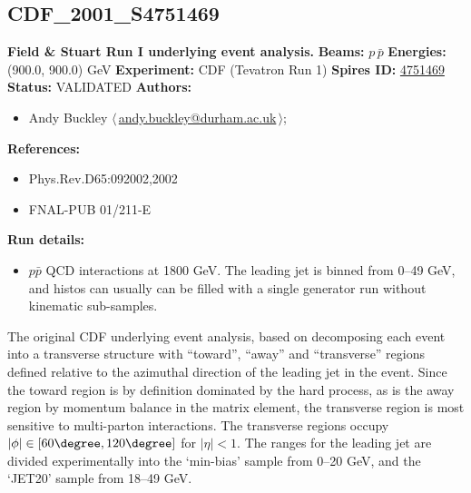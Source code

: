 \subsection[CDF\_2001\_S4751469]{CDF\_2001\_S4751469\,\cite{Affolder:2001xt}}
\textbf{Field \& Stuart Run I underlying event analysis.}\newline
\textbf{Beams:} $p$\,$\bar{p}$ \newline
\textbf{Energies:} (900.0, 900.0) GeV \newline
\textbf{Experiment:} CDF (Tevatron Run 1) \newline
\textbf{Spires ID:} \href{http://www.slac.stanford.edu/spires/find/hep/www?rawcmd=key+4751469}{4751469}\newline
\textbf{Status:} VALIDATED\newline
\textbf{Authors:}
\begin{itemize}
  \item Andy Buckley $\langle\,$\href{mailto:andy.buckley@durham.ac.uk}{andy.buckley@durham.ac.uk}$\,\rangle$;
\end{itemize}
\textbf{References:}
\begin{itemize}
  \item Phys.Rev.D65:092002,2002
  \item FNAL-PUB 01/211-E
\end{itemize}
\textbf{Run details:}
\begin{itemize}

  \item $p\bar{p}$ QCD interactions at 1800 GeV. The leading jet is binned from 0--49 GeV, and histos can usually can be filled with a single generator run without kinematic sub-samples.\end{itemize}

\noindent The original CDF underlying event analysis, based on decomposing each event into a transverse structure with ``toward'', ``away'' and ``transverse'' regions defined relative to the azimuthal direction of the leading jet in the event. Since the toward region is by definition dominated by the hard process, as is the away region by momentum balance in the matrix element, the transverse region is most sensitive to multi-parton interactions. The transverse regions occupy $|\phi| \in [60\degree, 120\degree]$ for $|\eta| < 1$. The \pT ranges for the leading jet are divided experimentally into the `min-bias' sample from 0--20 GeV, and the `JET20' sample from 18--49 GeV.


